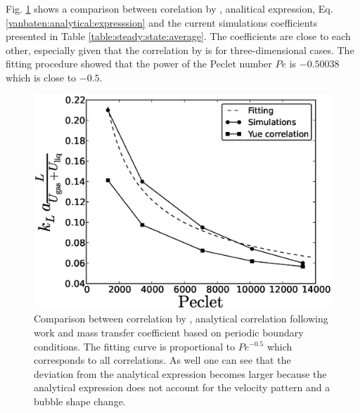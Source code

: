 \documentclass{article}
\begin{document}
Fig. \ref{fig:volume:mass:coefficient} shows a comparison between corelation by
\citet{yue-mass}, analitical expression, Eq. \ref{vanbaten:analytical:expresssion} and the current
simulations coefficients presented in Table
\ref{table:steady:state:average}. The coefficients are close to each other, especially given that
the correlation by \citet{yue-mass} is for three-dimensional cases. The fitting procedure showed
that the power of
the Peclet number $Pe$ is $-0.50038$ which is close to $-0.5$. 
\begin{figure}[htb!]
\includegraphics[width=\textwidth]{Figures/correlations_comparison.eps}
\caption{Comparison between correlation by \citet{yue-mass}, analytical correlation following work
\cite{irandoust} and mass transfer coefficient based
on periodic boundary conditions. The fitting curve is proportional to $Pe^{-0.5}$ which corresponds
to all correlations. As well one can see that the deviation from the analytical expression becomes
larger because the analytical expression does not account for the velocity pattern and a bubble
shape change.\label{fig:volume:mass:coefficient}}
\end{figure}
\end{document}
